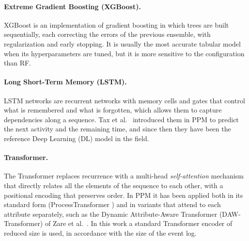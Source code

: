 \paragraph{Extreme Gradient Boosting (XGBoost).} XGBoost \cite{chen2016} is an implementation of gradient boosting \cite{friedman2001} in which trees are built sequentially, each correcting the errors of the previous ensemble, with regularization and early stopping. It is usually the most accurate tabular model when its hyperparameters are tuned, but it is more sensitive to the configuration than RF.

\paragraph{Long Short-Term Memory (LSTM).} LSTM networks \cite{hochreiter1997} are recurrent networks with memory cells and gates that control what is remembered and what is forgotten, which allows them to capture dependencies along a sequence. Tax et al.\ \cite{tax2017} introduced them in PPM to predict the next activity and the remaining time, and since then they have been the reference Deep Learning (DL) model in the field.

\paragraph{Transformer.} The Transformer \cite{vaswani2017} replaces recurrence with a multi-head \emph{self-attention} mechanism that directly relates all the elements of the sequence to each other, with a positional encoding that preserves order. In PPM it has been applied both in its standard form (ProcessTransformer \cite{bukhsh2021}) and in variants that attend to each attribute separately, such as the Dynamic Attribute-Aware Transformer (DAW-Transformer) of Zare et al.\ \cite{zare2025}. In this work a standard Transformer encoder of reduced size is used, in accordance with the size of the event log.
